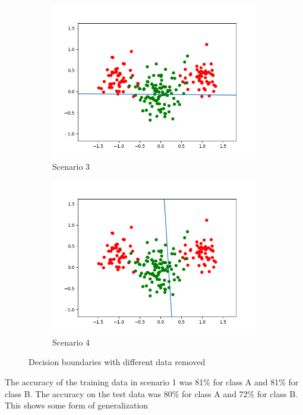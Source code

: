 \documentclass[a4paper]{article}
\begin{document}
\begin{figure}[htb]
\begin{subfigure}{0.4\textwidth}
        \includegraphics[width=\textwidth]{Labs/Lab 1/Lab 1a/Results/scenario3.png}
        \caption{Scenario 3}
        \label{fig:scenario-3}
    \end{subfigure}
    \hfill
    \begin{subfigure}{0.4\textwidth}
        \includegraphics[width=\textwidth]{Labs/Lab 1/Lab 1a/Results/scenario4.png}
        \caption{Scenario 4}
        \label{fig:scenario-4}
    \end{subfigure}
    \caption{Decision boundaries with different data removed}
    \label{fig:9}
\end{figure}
The accuracy of the training data in scenario 1 was 81\% for class A and 81\% for class B. The accuracy on the test data was 80\% for class A and 72\% for class B. This shows some form of generalization \\
\end{document}
